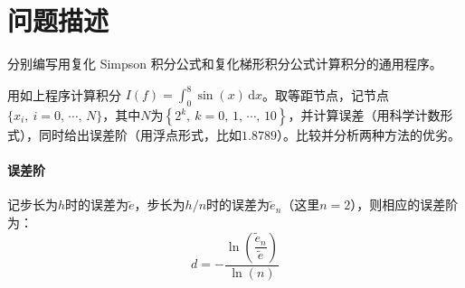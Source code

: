 \documentclass[11pt]{article}
\begin{document}
\maketitle
\thispagestyle{empty}
\newpage

\section{问题描述}
分别编写用复化 Simpson 积分公式和复化梯形积分公式计算积分的通用程序。

用如上程序计算积分 $I(f) = \displaystyle \int_0^8\!\sin{(x)}\,\text{d}x$。取等距节点，记节点$\{x_i,\ i = 0,\,\cdots,\,N\}$，其中$N$为$\left\{2^k,\ k = 0,\,1,\,\cdots,\,10\right\}$，并计算误差（用科学计数形式），同时给出误差阶（用浮点形式，比如$1.8789$）。比较并分析两种方法的优劣。

\paragraph{误差阶} 记步长为$h$时的误差为$\widetilde{e}$，步长为$h/n$时的误差为$\widetilde{e}_n$（这里$n = 2$），则相应的误差阶为：
\begin{equation*}
    d = - \frac{\ln{\left(\dfrac{\widetilde{e}_n}{\widetilde{e}}\right)}}{\ln{(n)}}
\end{equation*}
\end{document}
